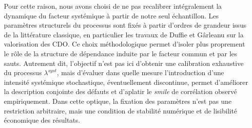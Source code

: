 Pour cette raison, nous avons choisi de ne pas recalibrer intégralement la dynamique du facteur systémique à partir de notre seul échantillon. Les paramètres structurels du processus sont fixés à partir d'ordres de grandeur issus de la littérature classique, en particulier les travaux de Duffie et Gârleanu sur la valorisation des CDO. Ce choix méthodologique permet d'isoler plus proprement le rôle de la structure de dépendance induite par le facteur commun et par les sauts. Autrement dit, l'objectif n'est pas ici d'obtenir une calibration exhaustive du processus $\lambda^{syst}$, mais d'évaluer dans quelle mesure l'introduction d'une intensité systémique stochastique, éventuellement discontinue, permet d'améliorer la description conjointe des défauts et d'aplatir le \textit{smile} de corrélation observé empiriquement. Dans cette optique, la fixation des paramètres n'est pas une restriction arbitraire, mais une condition de stabilité numérique et de lisibilité économique des résultats.
